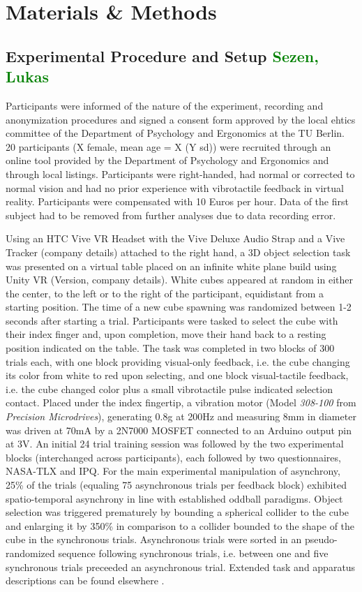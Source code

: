 \section{Materials \& Methods}
\subsection{Experimental Procedure and Setup \textcolor{green}{Sezen, Lukas}}
Participants were informed of the nature of the experiment, recording and anonymization procedures and signed a consent form approved by the local ehtics committee of the Department of Psychology and Ergonomics at the TU Berlin. 20 participants (X female, mean age = X (Y sd)) were recruited through an online tool provided by the Department of Psychology and Ergonomics and through local listings. Participants were right-handed, had normal or corrected to normal vision and had no prior experience with vibrotactile feedback in virtual reality. Participants were compensated with 10 Euros per hour. Data of the first subject had to be removed from further analyses due to data recording error.

Using an HTC Vive VR Headset with the Vive Deluxe Audio Strap and a Vive Tracker (company details) attached to the right hand, a 3D object selection task was presented on a virtual table placed on an infinite white plane build using Unity VR (Version, company details). White cubes appeared at random in either the center, to the left or to the right of the participant, equidistant from a starting position. The time of a new cube spawning was randomized between 1-2 seconds after starting a trial. Participants were tasked to select the cube with their index finger and, upon completion, move their hand back to a resting position indicated on the table. The task was completed in two blocks of 300 trials each, with one block providing visual-only feedback, i.e. the cube changing its color from white to red upon selecting, and one block visual-tactile feedback, i.e. the cube changed color plus a small vibrotactile pulse indicated selection contact. Placed under the index fingertip, a vibration motor (Model \textit{308-100} from \textit{Precision Microdrives}), generating 0.8g at 200Hz and measuring 8mm in diameter was driven at 70mA by a 2N7000 MOSFET connected to an Arduino output pin at 3V. An initial 24 trial training session was followed by the two experimental blocks (interchanged across participants), each followed by two questionnaires, NASA-TLX and IPQ. For the main experimental manipulation of asynchrony, 25\% of the trials (equaling 75 asynchronous trials per feedback block) exhibited spatio-temporal asynchrony in line with established oddball paradigms. Object selection was triggered prematurely by bounding a spherical collider to the cube and enlarging it by 350\% in comparison to a collider bounded to the shape of the cube in the synchronous trials. Asynchronous trials were sorted in an pseudo-randomized sequence following synchronous trials, i.e. between one and five synchronous trials preceeded an asynchronous trial. Extended task and apparatus descriptions can be found elsewhere \cite{Gehrke_2019}.

